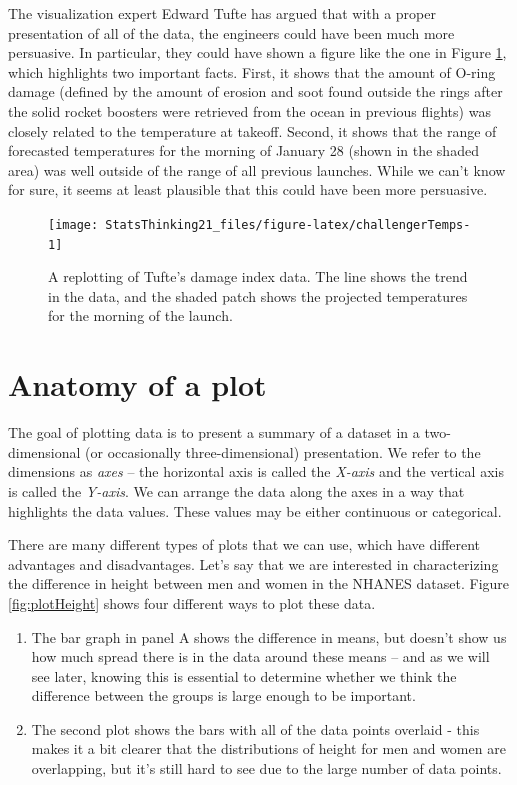 \documentclass[
  12pt,
]{book}
\providecommand{\tightlist}{%
  \setlength{\itemsep}{0pt}\setlength{\parskip}{0pt}}
\begin{document}
The visualization expert Edward Tufte has argued that with a proper presentation of all of the data, the engineers could have been much more persuasive. In particular, they could have shown a figure like the one in Figure \ref{fig:challengerTemps}, which highlights two important facts. First, it shows that the amount of O-ring damage (defined by the amount of erosion and soot found outside the rings after the solid rocket boosters were retrieved from the ocean in previous flights) was closely related to the temperature at takeoff. Second, it shows that the range of forecasted temperatures for the morning of January 28 (shown in the shaded area) was well outside of the range of all previous launches. While we can't know for sure, it seems at least plausible that this could have been more persuasive.

\begin{figure}
\texttt{[image: StatsThinking21\_files/figure-latex/challengerTemps-1]} \caption{A replotting of Tufte's damage index data. The line shows the trend in the data, and the shaded patch shows the projected temperatures for the morning of the launch.}\label{fig:challengerTemps}
\end{figure}

\hypertarget{anatomy-of-a-plot}{%
\section{Anatomy of a plot}\label{anatomy-of-a-plot}}

The goal of plotting data is to present a summary of a dataset in a two-dimensional (or occasionally three-dimensional) presentation. We refer to the dimensions as \emph{axes} -- the horizontal axis is called the \emph{X-axis} and the vertical axis is called the \emph{Y-axis}. We can arrange the data along the axes in a way that highlights the data values. These values may be either continuous or categorical.

There are many different types of plots that we can use, which have different advantages and disadvantages. Let's say that we are interested in characterizing the difference in height between men and women in the NHANES dataset. Figure \ref{fig:plotHeight} shows four different ways to plot these data.

\begin{enumerate}
\def\labelenumi{\arabic{enumi}.}
\tightlist
\item
  The bar graph in panel A shows the difference in means, but doesn't show us how much spread there is in the data around these means -- and as we will see later, knowing this is essential to determine whether we think the difference between the groups is large enough to be important.\\
\item
  The second plot shows the bars with all of the data points overlaid - this makes it a bit clearer that the distributions of height for men and women are overlapping, but it's still hard to see due to the large number of data points.
\end{enumerate}
\end{document}

